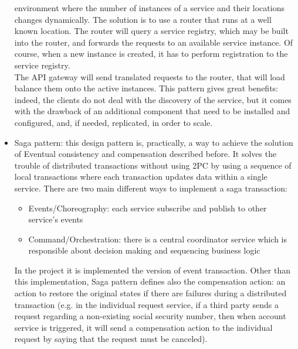 \begin{itemize}
environment where the number of instances of a service and their locations changes dynamically. 
The solution is to use a router that runs at a well known location. 
The router will query a service registry, which may be built into the
router, and forwards the requests to an available service instance.
Of course, when a new instance is created, it has to perform registration to the service registry. \\
The API gateway will send translated requests to the router, that will load balance them onto the active instances.
This pattern gives great benefits: indeed, the clients do not deal with the discovery of the service, but it comes with the drawback of
an additional component that need to be installed and configured, and, if needed, replicated, in order to scale. 
\item Saga pattern: this design pattern is, practically, a way to achieve the solution of Eventual consistency and compensation described before. It solves the trouble of distributed transactions without using 2PC by using a sequence of local transactions where each transaction updates data within a single service. There are two main different ways to implement a saga transaction:
\begin{itemize}
\item Events/Choreography: each service subscribe and publish to other service's events
\item Command/Orchestration: there is a central coordinator service which is responsible about decision making and sequencing business logic 
\end{itemize}
In the project it is implemented the version of event transaction. Other than this implementation, Saga pattern defines also 
the compensation action: an action to restore the original states if there are failures during a distributed transaction (e.g. in 
the individual request service, if a third party sends a request regarding a non-existing social security number, then when 
account service is triggered, it will send a compensation action to the individual request by saying that the request must be canceled).

\end{itemize}